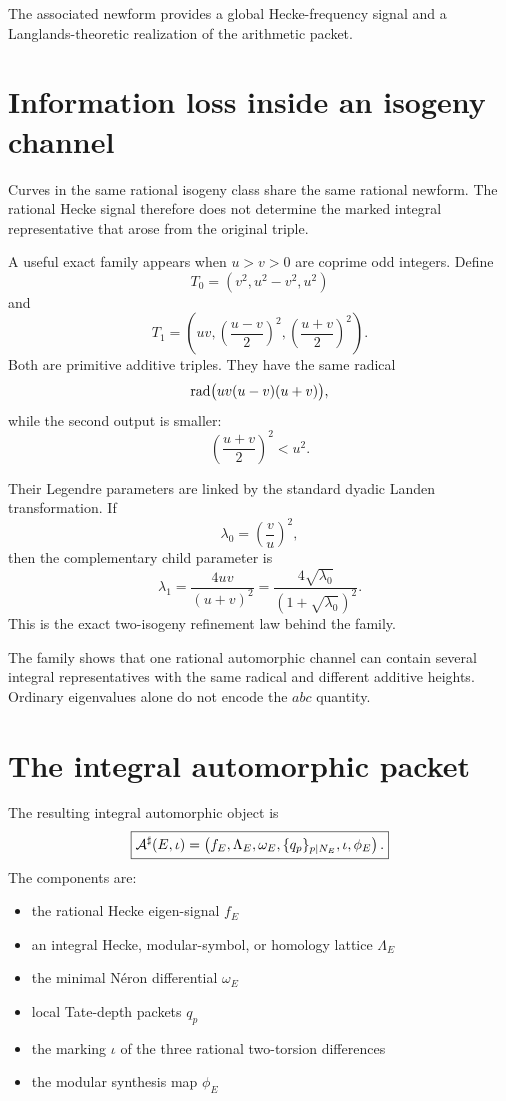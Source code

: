 The associated newform provides a global Hecke-frequency signal and a Langlands-theoretic realization of the arithmetic packet.

\section{Information loss inside an isogeny channel}
Curves in the same rational isogeny class share the same rational newform. The rational Hecke signal therefore does not determine the marked integral representative that arose from the original triple.

A useful exact family appears when $u>v>0$ are coprime odd integers. Define
\[
T_0
=
\left(v^2,u^2-v^2,u^2\right)
\]
and
\[
T_1
=
\left(
uv,
\left(\frac{u-v}{2}\right)^2,
\left(\frac{u+v}{2}\right)^2
\right).
\]
Both are primitive additive triples. They have the same radical
\[
\operatorname{rad}\bigl(uv(u-v)(u+v)\bigr),
\]
while the second output is smaller:
\[
\left(\frac{u+v}{2}\right)^2<u^2.
\]

Their Legendre parameters are linked by the standard dyadic Landen transformation. If
\[
\lambda_0=\left(\frac vu\right)^2,
\]
then the complementary child parameter is
\[
\lambda_1
=
\frac{4uv}{(u+v)^2}
=
\frac{4\sqrt{\lambda_0}}{(1+\sqrt{\lambda_0})^2}.
\]
This is the exact two-isogeny refinement law behind the family.

The family shows that one rational automorphic channel can contain several integral representatives with the same radical and different additive heights. Ordinary eigenvalues alone do not encode the $abc$ quantity.

\section{The integral automorphic packet}
The resulting integral automorphic object is
\[
\boxed{
\mathcal A^{\sharp}(E,\iota)
=
\left(
 f_E,
 \Lambda_E,
 \omega_E,
 \{q_p\}_{p\mid N_E},
 \iota,
 \phi_E
\right).
}
\]
The components are:
\begin{itemize}[leftmargin=1.5em]
\item the rational Hecke eigen-signal $f_E$
\item an integral Hecke, modular-symbol, or homology lattice $\Lambda_E$
\item the minimal N\'eron differential $\omega_E$
\item local Tate-depth packets $q_p$
\item the marking $\iota$ of the three rational two-torsion differences
\item the modular synthesis map $\phi_E$
\end{itemize}

